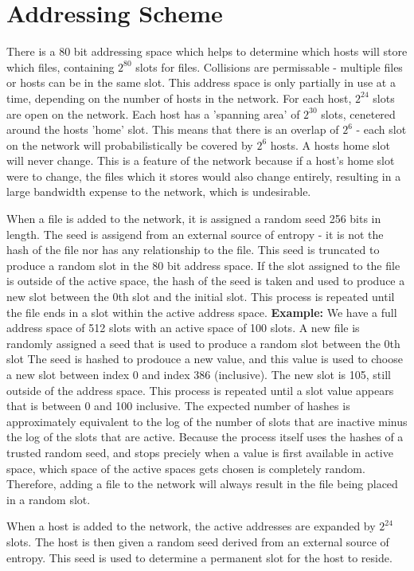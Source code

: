 \documentclass[twocolumn]{article}
\begin{document}
\iffalse
\section{Addressing Scheme}
There is a 80 bit addressing space which helps to determine which hosts will store which files, containing $2^{80}$ slots for files.
Collisions are permissable - multiple files or hosts can be in the same slot.
This address space is only partially in use at a time, depending on the number of hosts in the network. For each host, $2^{24}$ slots are open on the network.
Each host has a 'spanning area' of $2^{30}$ slots, cenetered around the hosts 'home' slot. This means that there is an overlap of $2^6$ - each slot on the network will probabilistically be covered by $2^6$ hosts.
A hosts home slot will never change.
This is a feature of the network because if a host's home slot were to change, the files which it stores would also change entirely, resulting in a large bandwidth expense to the network, which is undesirable.

When a file is added to the network, it is assigned a random seed 256 bits in length.
The seed is assigend from an external source of entropy - it is not the hash of the file nor has any relationship to the file.
This seed is truncated to produce a random slot in the 80 bit address space.
If the slot assigned to the file is outside of the active space, the hash of the seed is taken and used to produce a new slot between the 0th slot and the initial slot.
This process is repeated until the file ends in a slot within the active address space.
\textbf{Example:} We have a full address space of 512 slots with an active space of 100 slots.
A new file is randomly assigned a seed that is used to produce a random slot between the 0th slot
The seed is hashed to prodouce a new value, and this value is used to choose a new slot between index 0 and index 386 (inclusive).
The new slot is 105, still outside of the address space.
This process is repeated until a slot value appears that is between 0 and 100 inclusive.
The expected number of hashes is approximately equivalent to the log of the number of slots that are inactive minus the log of the slots that are active.
Because the process itself uses the hashes of a trusted random seed, and stops preciely when a value is first available in active space, which space of the active spaces gets chosen is completely random.
Therefore, adding a file to the network will always result in the file being placed in a random slot.

When a host is added to the network, the active addresses are expanded by $2^{24}$ slots.
The host is then given a random seed derived from an external source of entropy.
This seed is used to determine a permanent slot for the host to reside.
\end{document}
